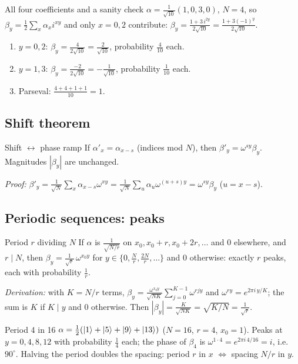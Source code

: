 \documentclass[11pt,a4paper,openany]{book}
\newcounter{wex}[chapter]
\newenvironment{steps}{\begin{enumerate}[label=\textbf{Step \arabic*.}, leftmargin=4.2em, itemsep=2pt]}{\end{enumerate}}
\begin{document}
\begin{wexample}{All four coefficients and a sanity check}
$\alpha = \frac{1}{\sqrt{10}}(1, 0, 3, 0)$, $N = 4$, so $\beta_y = \frac12\sum_x\alpha_x i^{xy}$ and only $x = 0, 2$ contribute: $\beta_y = \frac{1 + 3\,i^{2y}}{2\sqrt{10}} = \frac{1 + 3(-1)^y}{2\sqrt{10}}$.
\begin{steps}
\item $y = 0, 2$: $\beta_y = \frac{4}{2\sqrt{10}} = \frac{2}{\sqrt{10}}$, probability $\frac{4}{10}$ each.
\item $y = 1, 3$: $\beta_y = \frac{-2}{2\sqrt{10}} = -\frac{1}{\sqrt{10}}$, probability $\frac1{10}$ each.
\item Parseval: $\frac{4 + 4 + 1 + 1}{10} = 1$. \checkmark
\end{steps}
\end{wexample}

\subsection{Shift theorem}
\begin{keyres}{Shift $\leftrightarrow$ phase ramp}
If $\alpha'_x = \alpha_{x - s}$ (indices mod $N$), then $\beta'_y = \omega^{sy}\beta_y$. Magnitudes $|\beta_y|$ are unchanged.
\end{keyres}
\emph{Proof:} $\beta'_y = \frac{1}{\sqrt N}\sum_x\alpha_{x-s}\omega^{xy} = \frac{1}{\sqrt N}\sum_{u}\alpha_u\omega^{(u+s)y} = \omega^{sy}\beta_y$ ($u = x - s$).

\subsection{Periodic sequences: peaks}
\begin{keyres}{Period $r$ dividing $N$}
If $\alpha$ is $\frac{1}{\sqrt{N/r}}$ on $x_0, x_0 + r, x_0 + 2r, \dots$ and 0 elsewhere, and $r \mid N$, then
$\beta_y = \frac{1}{\sqrt r}\,\omega^{x_0y}$ for $y \in \{0, \tfrac Nr, \tfrac{2N}{r}, \dots\}$ and $0$ otherwise: exactly $r$ peaks, each with probability $\frac1r$.
\end{keyres}
\emph{Derivation:} with $K = N/r$ terms, $\beta_y = \frac{\omega^{x_0y}}{\sqrt{NK}}\sum_{j=0}^{K-1}\omega^{rjy}$ and $\omega^{r y} = e^{2\pi i\,y/K}$; the sum is $K$ if
$K \mid y$ and 0 otherwise. Then $|\beta_y| = \frac{K}{\sqrt{NK}} = \sqrt{K/N} = \frac{1}{\sqrt r}$.

\begin{wexample}{Period 4 in 16}
$\alpha = \frac12(\ket1 + \ket5 + \ket9 + \ket{13})$ ($N = 16$, $r = 4$, $x_0 = 1$). Peaks at $y = 0, 4, 8, 12$ with probability $\frac14$ each; the
phase of $\beta_4$ is $\omega^{1\cdot4} = e^{2\pi i\,4/16} = i$, i.e.\ $90^\circ$. Halving the period doubles the spacing:
period $r$ in $x$ $\Leftrightarrow$ spacing $N/r$ in $y$.
\end{wexample}
\end{document}

